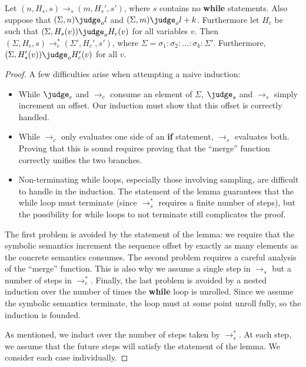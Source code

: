 \begin{lemma}
  \label{passert:lem:stmt}
  Let
  $(n, H_s, s) \to_s (m, H_s', s')$,
  where $s$ contains no \textbf{while} statements.
  Also suppose that $(\Sigma, n) \judge_o l$
  and $(\Sigma, m) \judge_o l + k$.
  Furthermore let $H_c$ be such that
  $(\Sigma, H_s(v)) \judge_o H_c(v)$
  for all variables $v$. Then
  $(\Sigma, H_c, s) \to_c^{*} (\Sigma', H_c', s')$,
  where
  $\Sigma = \sigma_1:\sigma_2:\dots:\sigma_k:\Sigma'$.
  Furthermore,
  $(\Sigma, H_s'(v)) \judge_o H_c'(v)$
  for all $v$.
\end{lemma}

\begin{proof}
  A few difficulties arise when attempting a naive induction:

  \begin{itemize}
  \item While $\judge_c$ and $\to_c$ consume an element of $\Sigma$,
    $\judge_s$ and $\to_s$ simply increment an offset. Our induction
    must show that this offset is correctly handled.
  \item While $\to_c$ only evaluates one side of an \textbf{if}
    statement, $\to_s$ evaluates both.  Proving that this is sound
    requires proving that the ``merge'' function correctly unifies the
    two branches.
  \item Non-terminating while loops, especially those involving
    sampling, are difficult to handle in the induction.  The statement
    of the lemma guarantees that the while loop must terminate (since
    $\to_s^{*}$ requires a finite number of steps), but the possibility
    for while loops to not terminate still complicates the proof.
  \end{itemize}
   
  The first problem is avoided by the statement of the lemma: we
  require that the symbolic semantics increment the sequence offset by
  exactly as many elements as the concrete semantics consumes.  The
  second problem requires a careful analysis of the ``merge''
  function.  This is also why we assume a single step in $\to_s$ but a
  number of steps in $\to_c^{*}$.  Finally, the last problem is avoided
  by a nested induction over the number of times the \textbf{while}
  loop is unrolled.  Since we assume the symbolic semantics terminate,
  the loop must at some point unroll fully, so the induction is
  founded.

  As mentioned, we induct over the number of steps taken by $\to_s^{*}$.
  At each step, we assume that the future steps will satisfy the
  statement of the lemma.  We consider each case individually.


\end{proof}
